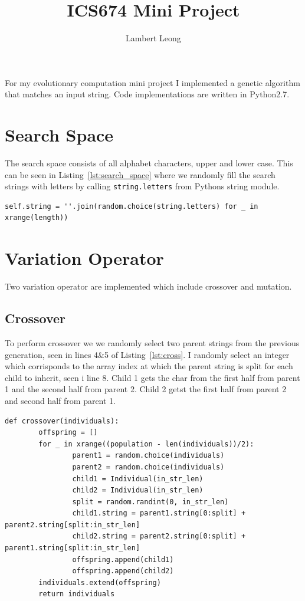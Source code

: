 \documentclass[12pt]{article}
\title{ICS674 Mini Project}
\author{Lambert Leong}
\begin{document}

\maketitle

For my evolutionary computation mini project I implemented a genetic algorithm
that matches an input string.  Code implementations are written in Python2.7.

\section{Search Space}

The search space consists of all alphabet characters, upper and lower case.
This can be seen in Listing~\ref{lst:search_space} where we randomly fill the
search strings with letters by calling \texttt{string.letters} from Pythons
string module.

\begin{lstlisting}[caption = {Search space is all letter characters, upper and
lower case }, label = {lst:search_space}]
self.string = ''.join(random.choice(string.letters) for _ in xrange(length))
\end{lstlisting}

\section{Variation Operator}

Two variation operator are implemented which include crossover and mutation.

\subsection{Crossover}

To perform crossover we we randomly select two parent strings from the previous
generation, seen in lines 4\&5 of Listing~\ref{lst:cross}.  I randomly select an
integer which corrisponds to the array index at which the parent string is split
for each child to inherit, seen i line 8.  Child 1 gets the char from the first
half from parent 1 and the second half from parent 2.  Child 2 getst the first
half from parent 2 and second half from parent 1.

\begin{lstlisting}[caption = {Crossover Function}, label = {lst:cross}]
def crossover(individuals):
        offspring = []
        for _ in xrange((population - len(individuals))/2):
                parent1 = random.choice(individuals)
                parent2 = random.choice(individuals)
                child1 = Individual(in_str_len)
                child2 = Individual(in_str_len)
                split = random.randint(0, in_str_len)
                child1.string = parent1.string[0:split] + parent2.string[split:in_str_len]
                child2.string = parent2.string[0:split] + parent1.string[split:in_str_len]
                offspring.append(child1)
                offspring.append(child2)
        individuals.extend(offspring)
        return individuals
\end{lstlisting}
\end{document}
